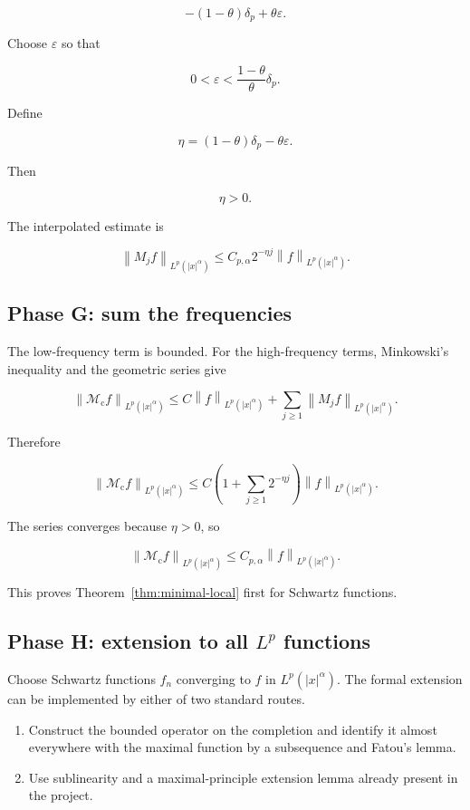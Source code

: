 \documentclass[11pt,a4paper]{article}
\theoremstyle{definition}
\theoremstyle{remark}
\newcommand{\Mc}{\mathcal{M}_{\mathrm{c}}}
\newcommand{\norm}[1]{\left\lVert #1\right\rVert}
\newcommand{\abs}[1]{\left\lvert #1\right\rvert}
\begin{document}
\[
-(1-\theta)\delta_p+\theta\varepsilon.
\]

Choose $\varepsilon$ so that

\[
0<\varepsilon<\frac{1-\theta}{\theta}\delta_p.
\]

Define

\[
\eta=(1-\theta)\delta_p-\theta\varepsilon.
\]

Then

\[
\eta>0.
\]

The interpolated estimate is

\[
\norm{M_jf}_{L^p(\abs{x}^{\alpha})}
\leq C_{p,\alpha}2^{-\eta j}
\norm{f}_{L^p(\abs{x}^{\alpha})}.
\]

\subsection{Phase G: sum the frequencies}

The low-frequency term is bounded.  For the high-frequency terms, Minkowski's
inequality and the geometric series give

\[
\norm{\Mc f}_{L^p(\abs{x}^{\alpha})}
\leq
C\norm{f}_{L^p(\abs{x}^{\alpha})}
+
\sum_{j\geq1}
\norm{M_jf}_{L^p(\abs{x}^{\alpha})}.
\]

Therefore

\[
\norm{\Mc f}_{L^p(\abs{x}^{\alpha})}
\leq
C\left(1+\sum_{j\geq1}2^{-\eta j}\right)
\norm{f}_{L^p(\abs{x}^{\alpha})}.
\]

The series converges because $\eta>0$, so

\[
\norm{\Mc f}_{L^p(\abs{x}^{\alpha})}
\leq C_{p,\alpha}\norm{f}_{L^p(\abs{x}^{\alpha})}.
\]

This proves Theorem~\ref{thm:minimal-local} first for Schwartz functions.

\subsection{Phase H: extension to all $L^p$ functions}

Choose Schwartz functions $f_n$ converging to $f$ in
$L^p(\abs{x}^{\alpha})$.  The formal extension can be implemented by either of
two standard routes.

\begin{enumerate}[leftmargin=8mm]
\item Construct the bounded operator on the completion and identify it almost
      everywhere with the maximal function by a subsequence and Fatou's lemma.
\item Use sublinearity and a maximal-principle extension lemma already present
      in the project.
\end{enumerate}
\end{document}
